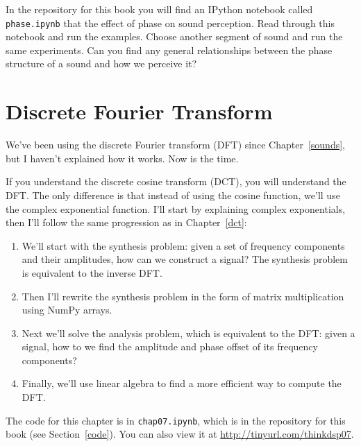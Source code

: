 \documentclass[12pt]{book}
\begin{document}
\begin{exercise}
In the repository for this book you will find an IPython notebook
called \verb"phase.ipynb" that the effect of phase on sound
perception.
Read through this notebook and run the examples.  
Choose another segment of sound and run the same experiments.
Can you find any general relationships between the phase structure
of a sound and how we perceive it?
\end{exercise}




\chapter{Discrete Fourier Transform}
\label{dft}

We've been using the discrete Fourier transform (DFT) since
Chapter~\ref{sounds}, but I haven't explained how it works.  Now is
the time.

If you understand the discrete cosine transform (DCT), you will
understand the DFT.  The only difference is that instead of using the
cosine function, we'll use the complex exponential function.  I'll
start by explaining complex exponentials, then I'll follow the
same progression as in Chapter~\ref{dct}:

\begin{enumerate}

\item We'll start with the synthesis
  problem: given a set of frequency components and their amplitudes,
  how can we construct a signal?  The synthesis problem is 
  equivalent to the inverse DFT.

\item Then I'll rewrite the synthesis problem in the form of matrix
  multiplication using NumPy arrays.

\item Next we'll solve the analysis problem, which is equivalent to
  the DFT: given a signal, how to we find the amplitude and phase
  offset of its frequency components?

\item Finally, we'll use linear algebra to find a more efficient way
  to compute the DFT.

\end{enumerate}

The code for this chapter is in {\tt chap07.ipynb}, which is in the
repository for this book (see Section~\ref{code}).
You can also view it at \url{http://tinyurl.com/thinkdsp07}.
\end{document}
